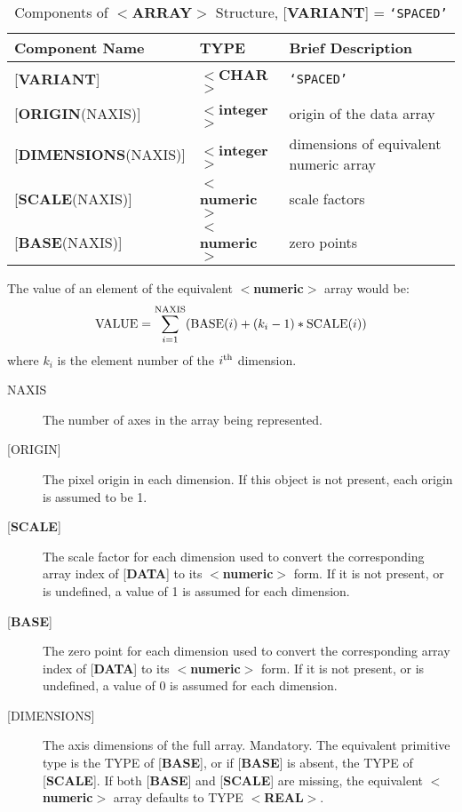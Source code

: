 \documentclass[twoside,11pt]{article}
\renewcommand{\_}{\texttt{\symbol{95}}}
\begin{document}
\begin{table}[htb]
\centering
\caption{Components of $<${\bf ARRAY}$>$ Structure,
{[}{\bf VARIANT}{]} = {\tt `SPACED'}}
\begin{tabular}{|l|l|l|}
\hline
Component Name & TYPE & Brief Description \\  \hline
{[}{\bf VARIANT}{]} & $<${\bf \_CHAR}$>$ & {\tt `SPACED'} \\
{[}{\bf ORIGIN}(NAXIS){]} & $<${\bf integer}$>$ & origin of the data array \\
{[}{\bf DIMENSIONS}(NAXIS){]} & $<${\bf integer}$>$ & dimensions of equivalent numeric array\\
{[}{\bf SCALE}(NAXIS){]} & $<${\bf numeric}$>$ & scale factors \\
{[}{\bf BASE}(NAXIS){]} & $<${\bf numeric}$>$ & zero points \\ \hline
\end{tabular}
\end{table}

The value of an element of the equivalent
$<${\bf numeric}$>$ array would be:
\[{\rm VALUE} = \sum_{i=1}^{\rm NAXIS} ({\rm BASE}(i) + (k_i-1) * {\rm SCALE}(i) ) \]
where $k_i$ is the element number of the $i^{\rm th}$ dimension.
\begin{description}
\item [NAXIS]
The number of axes in the array being represented.
\item [{[}ORIGIN{]}]
The pixel origin in each dimension.  If this object is not present,
each origin is assumed to be 1. 
\item [{[}{\bf SCALE}{]}]
The scale factor for each dimension used to convert the corresponding
array index of {[}{\bf DATA}{]} to its
$<${\bf numeric}$>$ form.  If it is not present, or is undefined,
a value of 1 is assumed for each dimension.
\item [{[}{\bf BASE}{]}]
The zero point for each dimension used to convert the corresponding
array index of {[}{\bf DATA}{]} to its
$<${\bf numeric}$>$ form.  If it is not present, or is undefined, a value of 0
is assumed for each dimension.
\item [{[}DIMENSIONS{]}]
The axis dimensions of the full array.  Mandatory.
The equivalent primitive type
is the TYPE of {[}{\bf BASE}{]}, or if {[}{\bf BASE}{]} is
absent, the TYPE of {[}{\bf SCALE}{]}.  If both
{[}{\bf BASE}{]} and {[}{\bf SCALE}{]} are missing, the
equivalent $<${\bf numeric}$>$ array defaults to
TYPE $<${\bf \_REAL}$>$.
\end{description}
\end{document}
